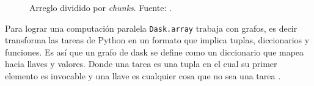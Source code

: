 \begin{figure}
 \centering
 \caption[Arreglo dividido por chunks]{Arreglo dividido por \textit{chunks}. Fuente: \citep{Dask_chunks}.}
 \label{fig:chunks}
\end{figure}


Para lograr una computación paralela \verb|Dask.array| trabaja con grafos, es decir transforma las tareas de Python en un formato que implica tuplas, diccionarios y funciones. Es así que un grafo de dask se define como un diccionario que mapea hacia llaves y valores. Donde una tarea es una tupla en el cual su primer elemento es invocable y una llave es cualquier cosa que no sea una tarea \citep{rocklin2015dask}.

